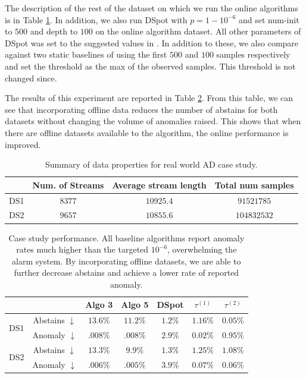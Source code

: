 The description of the rest of the dataset on which we run the online algorithms is in Table \ref{tab:real_data_stats}. In addition, we also run {\ttfamily DSpot} \cite{siffer2017anomaly} with $p = 1 - 10^{-6}$ and set {\ttfamily num-init} to $500$ and {\ttfamily depth} to $100$ on the online algorithm dataset. All other parameters of {\ttfamily DSpot} was set to the suggested values in \cite{siffer2017anomaly}. In addition to these, we also compare against two static baselines of using the first $500$ and $100$ samples respectively and set the threshold as the max of the observed samples. This threshold is not changed since. 

The results of this experiment are reported in Table \ref{tab:real_data}. From this table, we can see that incorporating offline data reduces the number of abstains for both datasets without changing the volume of anomalies raised. This shows that when there are offline datasets available to the algorithm, the online performance is improved. 


\begin{table}[h!]
    \centering
    \begin{tabular}{c|c|c|c}
    \toprule
     & Num. of Streams & Average stream length &  Total num samples   \\ \midrule 
{DS1}  & $8377$ & $10925.4$ & $91521785$\\ \midrule
{DS2}  & $9657$ &  $10855.6$ & $104832532$\\
         \bottomrule
    \end{tabular}
    \caption{Summary of data properties for real world AD case study.}
    \label{tab:real_data_stats}
\end{table}


\begin{table}[h!]
    \centering

    \begin{tabular}{c|c|c|c| c| c|c}
    \toprule
                &  & Algo 3 & Algo 5 &  DSpot & $\tau^{(1)}$  & $\tau^{(2)}$  \\
        \midrule
         \multirow{2}{*}{DS1}  & Abstains $\downarrow$ & $13.6\%$ & $11.2\%$ & $1.2\%$ & $1.16\%$ & $0.05\%$\\
          & Anomaly $\downarrow$ & $\mathbf{.008\%}$ & {$\mathbf{.008\%}$} & $2.9\%$ & $0.02\%$ & $0.95\%$\\
          \midrule
         \multirow{2}{*}{DS2}  & Abstains $\downarrow$ & $13.3\%$ & $9.9\%$ & $1.3\%$& $1.25\%$ & $1.08\%$   \\
          & Anomaly $\downarrow$ & $.006\%$ & $\mathbf{.005\%}$ & $3.9\%$ & $0.07\%$ & $0.06\%$ \\
         \bottomrule
    \end{tabular}
    
    \caption{Case study performance. All baseline algorithms report anomaly rates much higher than the targeted $10^{-6}$, overwhelming the alarm system. By incorporating offline datasets, we are able to further decrease abstains and achieve a lower rate of reported anomaly. 
    }
    \label{tab:real_data}
\end{table}

